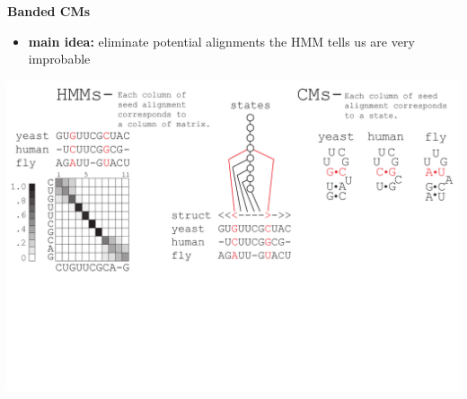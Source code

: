 \documentclass[landscape]{slides}
\begin{document}
\begin{slide}
\begin{center}
\large
\textbf{Banded CMs}
\end{center}
\medskip
\small
\begin{itemize}
\item
\textbf{main idea:} eliminate potential alignments the HMM tells us are very improbable
\end{itemize}
\begin{center}
\includegraphics[width=8in]{figs/post_hmm_to_cm_map2_layer7}
\end{center}
\vfill
\end{slide}
\end{document}
